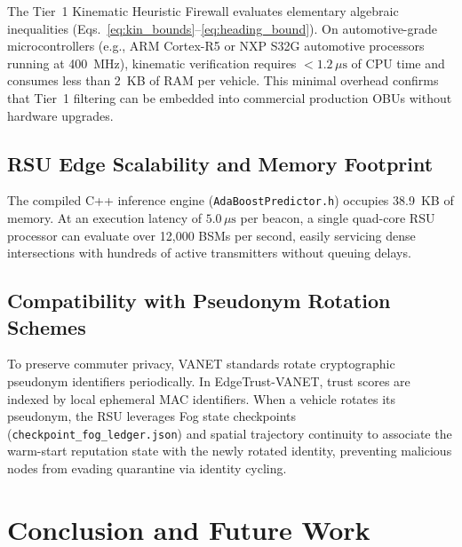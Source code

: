\documentclass[conference]{IEEEtran}
\begin{document}
The Tier~1 Kinematic Heuristic Firewall evaluates elementary algebraic inequalities (Eqs.~\ref{eq:kin_bounds}--\ref{eq:heading_bound}). On automotive-grade microcontrollers (e.g., ARM Cortex-R5 or NXP S32G automotive processors running at 400~MHz), kinematic verification requires $<1.2\,\mu\text{s}$ of CPU time and consumes less than 2~KB of RAM per vehicle. This minimal overhead confirms that Tier~1 filtering can be embedded into commercial production OBUs without hardware upgrades.

\subsection{RSU Edge Scalability and Memory Footprint}

The compiled C++ inference engine (\texttt{AdaBoostPredictor.h}) occupies 38.9~KB of memory. At an execution latency of $5.0\,\mu\text{s}$ per beacon, a single quad-core RSU processor can evaluate over 12,000 BSMs per second, easily servicing dense intersections with hundreds of active transmitters without queuing delays.

\subsection{Compatibility with Pseudonym Rotation Schemes}

To preserve commuter privacy, VANET standards rotate cryptographic pseudonym identifiers periodically. In EdgeTrust-VANET, trust scores are indexed by local ephemeral MAC identifiers. When a vehicle rotates its pseudonym, the RSU leverages Fog state checkpoints (\texttt{checkpoint\_fog\_ledger.json}) and spatial trajectory continuity to associate the warm-start reputation state with the newly rotated identity, preventing malicious nodes from evading quarantine via identity cycling.


\section{Conclusion and Future Work}
\end{document}
